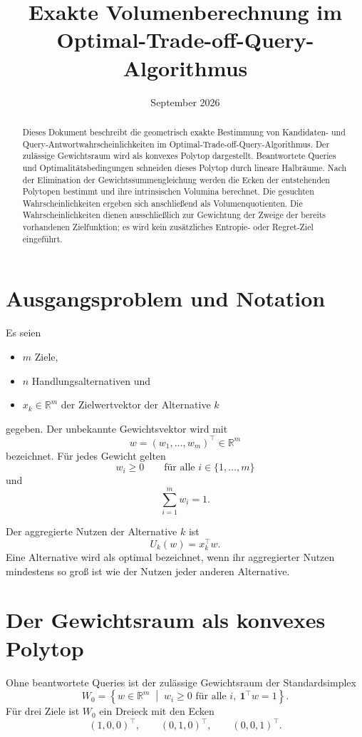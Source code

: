 \documentclass[11pt,a4paper]{article}
\title{Exakte Volumenberechnung im\\Optimal-Trade-off-Query-Algorithmus}
\author{}
\date{September 2026}
\newcommand{\R}{\mathbb{R}}
\begin{document}
\maketitle

\begin{abstract}
Dieses Dokument beschreibt die geometrisch exakte Bestimmung von
Kandidaten- und Query-Antwortwahrscheinlichkeiten im
Optimal-Trade-off-Query-Algorithmus. Der zulässige Gewichtsraum wird als
konvexes Polytop dargestellt. Beantwortete Queries und
Optimalitätsbedingungen schneiden dieses Polytop durch lineare Halbräume.
Nach der Elimination der Gewichtssummengleichung werden die Ecken der
entstehenden Polytopen bestimmt und ihre intrinsischen Volumina berechnet.
Die gesuchten Wahrscheinlichkeiten ergeben sich anschließend als
Volumenquotienten. Die Wahrscheinlichkeiten dienen ausschließlich zur
Gewichtung der Zweige der bereits vorhandenen Zielfunktion; es wird kein
zusätzliches Entropie- oder Regret-Ziel eingeführt.
\end{abstract}

\tableofcontents

\section{Ausgangsproblem und Notation}

Es seien
\begin{itemize}
  \item $m$ Ziele,
  \item $n$ Handlungsalternativen und
  \item $x_k\in\R^m$ der Zielwertvektor der Alternative $k$
\end{itemize}
gegeben. Der unbekannte Gewichtsvektor wird mit
\[
  w=(w_1,\dots,w_m)^\top\in\R^m
\]
bezeichnet. Für jedes Gewicht gelten
\[
  w_i\geq 0
  \qquad\text{für alle }i\in\{1,\dots,m\}
\]
und
\[
  \sum_{i=1}^{m}w_i=1.
\]

Der aggregierte Nutzen der Alternative $k$ ist
\[
  U_k(w)=x_k^\top w.
\]
Eine Alternative wird als optimal bezeichnet, wenn ihr aggregierter Nutzen
mindestens so groß ist wie der Nutzen jeder anderen Alternative.

\section{Der Gewichtsraum als konvexes Polytop}

Ohne beantwortete Queries ist der zulässige Gewichtsraum der Standardsimplex
\[
  W_0
  =
  \left\{
    w\in\R^m
    \;\middle|\;
    w_i\geq 0\text{ für alle }i,
    \ \boldsymbol{1}^\top w=1
  \right\}.
\]
Für drei Ziele ist $W_0$ ein Dreieck mit den Ecken
\[
  (1,0,0)^\top,
  \qquad
  (0,1,0)^\top,
  \qquad
  (0,0,1)^\top.
\]
\end{document}
